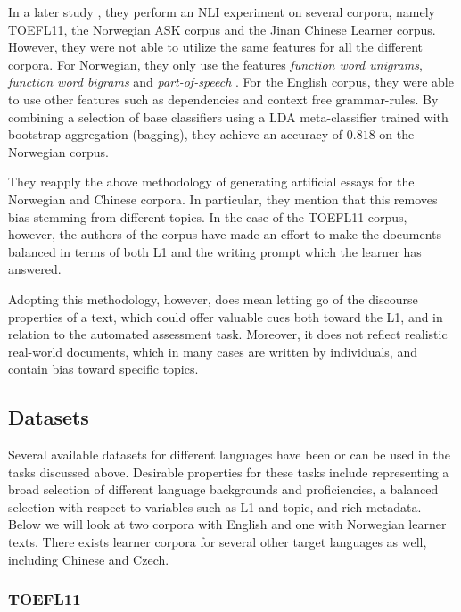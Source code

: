 In a later study \autocite{malmasi17}, they perform an \ac{NLI} experiment on
several corpora, namely TOEFL11, the Norwegian ASK corpus and the Jinan
Chinese Learner corpus. However, they were not able to utilize the same
features for all the different corpora. For Norwegian, they only use the
features \emph{function word unigrams}, \emph{function word bigrams} and
\emph{part-of-speech \ngrams}. For the English corpus, they were able to use
other features such as dependencies and context free grammar-rules. By
combining a selection of base classifiers using a \ac{LDA} meta-classifier
trained with bootstrap aggregation (bagging), they achieve an accuracy of
$0.818$ on the Norwegian corpus.

They reapply the above methodology of generating artificial essays for the
Norwegian and Chinese corpora. In particular, they mention that this removes
bias stemming from different topics. In the case of the TOEFL11 corpus,
however, the authors of the corpus have made an effort to make the documents
balanced in terms of both L1 and the writing prompt which the learner has
answered.

Adopting this methodology, however, does mean letting go of the discourse
properties of a text, which could offer valuable cues both toward the L1, and
in relation to the automated assessment task. Moreover, it does not reflect
realistic real-world documents, which in many cases are written by
individuals, and contain bias toward specific topics.


\subsection{Datasets}

Several available datasets for different languages have been or can be used
in the tasks discussed above. Desirable properties for these tasks include
representing a broad selection of different language backgrounds and
proficiencies, a balanced selection with respect to variables such as L1 and
topic, and rich metadata. Below we will look at two corpora with English and
one with Norwegian learner texts. There exists learner corpora for several
other target languages as well, including Chinese and Czech.


\subsubsection{TOEFL11}

